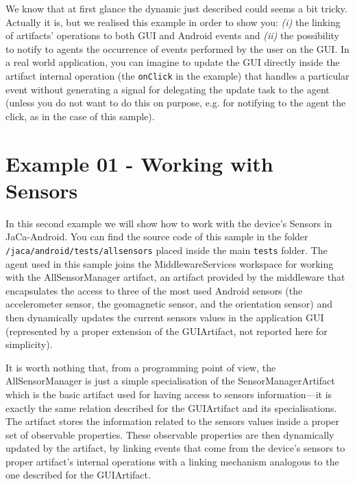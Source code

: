 \documentclass[11pt]{report}
\newcommand\code[1]{{\mbox{\texttt{{#1}}}}}
\newcommand{\jacandroid}{\textsf{JaCa-Android}}
\begin{document}
We know that at first glance the dynamic just described could seems a bit tricky. Actually it is, but we realised this example in order to show you: \textit{(i)} the linking of artifacts' operations to both GUI and Android events and \textit{(ii)} the possibility to notify to agents the occurrence of events performed by the user on the GUI. In a real world application, you can imagine to update the GUI directly inside the artifact internal operation (the \code{onClick} in the example) that handles a particular event without generating a signal for delegating the update task to the agent (unless you do not want to do this on purpose, e.g. for notifying to the agent the click, as in the case of this sample).


\section{Example 01 - Working with Sensors}
In this second example we will show how to work with the device's Sensors in \jacandroid{}. You can find the source code of this sample in the folder \code{/jaca/android/tests/allsensors} placed inside the main \code{tests} folder. 
%
The agent used in this sample joins the \textsf{MiddlewareServices} workspace for working with the \textsf{AllSensorManager} artifact, an artifact provided by the middleware that encapsulates the access to three of the most used Android sensors (the accelerometer sensor, the geomagnetic sensor, and the orientation sensor) and then dynamically updates the current sensors values in the application GUI (represented by a proper extension of the \textsf{GUIArtifact}, not reported here for simplicity). 


It is worth nothing that, from a programming point of view, the \textsf{AllSensorManager} is just a simple specialisation of the \textsf{SensorManagerArtifact} which is the basic artifact used for having access to sensors information---it is exactly the same relation described for the \mbox{\textsf{GUIArtifact}} and its specialisations. 
%
The artifact stores the information related to the sensors values inside a proper set of observable properties. These observable properties are then dynamically updated by the artifact, by linking events that come from the device's sensors to proper artifact's internal operations with a linking mechanism analogous to the one described for the \textsf{GUIArtifact}. 
 
\end{document}
